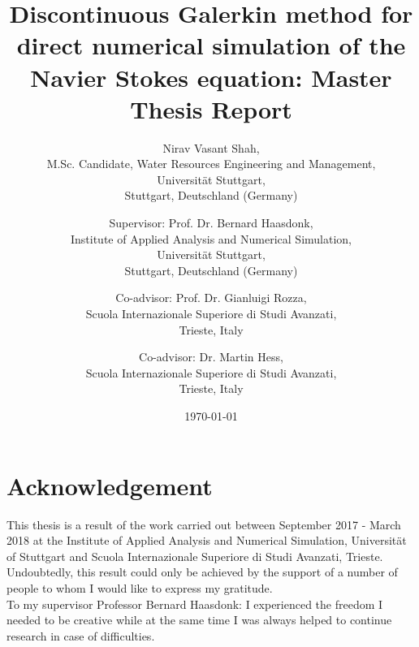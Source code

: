 \documentclass[a4paper,openany]{book}
\begin{document}
\begin{center}

\title{Discontinuous Galerkin method for direct numerical simulation of the Navier Stokes equation: Master Thesis Report}


\author{Nirav Vasant Shah, \\M.Sc. Candidate, Water Resources Engineering and Management, \\Universit\"at Stuttgart, \\Stuttgart, Deutschland (Germany)\\ 
\and Supervisor: Prof. Dr. Bernard Haasdonk,\\ Institute of Applied Analysis and Numerical Simulation, \\Universit\"at Stuttgart,\\ Stuttgart, Deutschland (Germany)\\ \and Co-advisor: Prof. Dr. Gianluigi Rozza,\\ Scuola Internazionale Superiore di Studi Avanzati, \\Trieste, Italy \\ \and Co-advisor: Dr. Martin Hess,\\ Scuola Internazionale Superiore di Studi Avanzati, \\Trieste, Italy }
\date{\today}
\maketitle

\end{center}

\noindent

\section{Acknowledgement}

This thesis is a result of the work carried out between September 2017 - March 2018 at the Institute of Applied Analysis and Numerical Simulation, Universit\"at of Stuttgart and Scuola Internazionale Superiore di Studi Avanzati, Trieste. \\

Undoubtedly, this result could only be achieved by the support of a number of people to whom I would
like to express my gratitude.\\

To my supervisor Professor Bernard Haasdonk: I experienced the freedom I needed to be
creative while at the same time I was always helped to continue research in case of difficulties. \\
\end{document}
